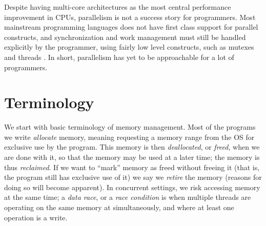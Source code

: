 \documentclass[b5paper]{report}
\begin{document}
Despite having multi-core architectures as the most central performance
improvement in CPUs, parallelism is not a success story for programmers. Most
mainstream programming languages does not have first class support for parallel
constructs, and synchronization and work management must still be
handled explicitly by the programmer, using fairly low level constructs, such
as mutexes and threads .
In short, parallelism has yet to be approachable for a lot of programmers.


\subsection*{}

\section{Terminology}
We start with basic terminology of memory management. Most of the programs we
write \emph{allocate} memory, meaning requesting a memory range from the OS for
exclusive use by the program. This memory is then \emph{deallocated}, or
\emph{freed}, when we are done with it, so that the memory may be used at a
later time; the memory is thus \emph{reclaimed}. If we want to ``mark'' memory
as freed without freeing it (that is, the program still has exclusive use of
it) we say we \emph{retire} the memory (reasons for doing so will become
apparent). In concurrent settings, we risk accessing memory at the same time; a
\emph{data race}, or a \emph{race condition} is when multiple threads are
operating on the same memory at simultaneously, and where at least one operation
is a write.
\end{document}
